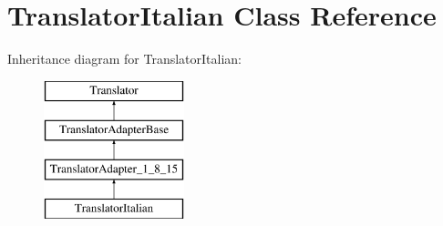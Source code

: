 \hypertarget{class_translator_italian}{}\section{Translator\+Italian Class Reference}
\label{class_translator_italian}
Inheritance diagram for Translator\+Italian\+:\begin{figure}[H]
\begin{center}
\leavevmode
\includegraphics[height=4.000000cm]{class_translator_italian}
\end{center}
\end{figure}
